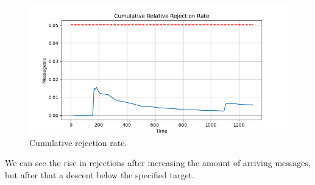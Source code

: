\begin{figure}[H]
    \centering
    \includegraphics[width=0.85\linewidth]{images/default/constant/rejection_cumulative.png}
    \caption{Cumulative rejection rate.}
    \label{fig:uniform_rejection}
\end{figure}

We can see the rise in rejections after increasing the amount of arriving messages, but after that a descent below the specified target.

